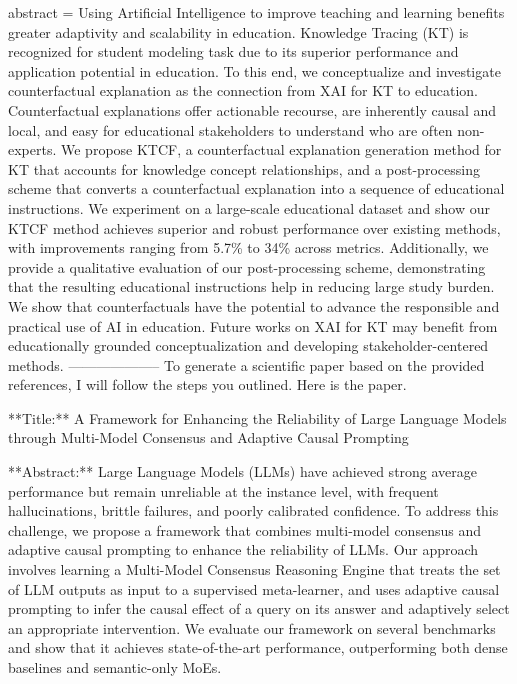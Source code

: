 {      abstract = {Using Artificial Intelligence to improve teaching and learning benefits greater adaptivity and scalability in education. Knowledge Tracing (KT) is recognized for student modeling task due to its superior performance and application potential in education. To this end, we conceptualize and investigate counterfactual explanation as the connection from XAI for KT to education. Counterfactual explanations offer actionable recourse, are inherently causal and local, and easy for educational stakeholders to understand who are often non-experts. We propose KTCF, a counterfactual explanation generation method for KT that accounts for knowledge concept relationships, and a post-processing scheme that converts a counterfactual explanation into a sequence of educational instructions. We experiment on a large-scale educational dataset and show our KTCF method achieves superior and robust performance over existing methods, with improvements ranging from 5.7\% to 34\% across metrics. Additionally, we provide a qualitative evaluation of our post-processing scheme, demonstrating that the resulting educational instructions help in reducing large study burden. We show that counterfactuals have the potential to advance the responsible and practical use of AI in education. Future works on XAI for KT may benefit from educationally grounded conceptualization and developing stakeholder-centered methods.}
}
        --------------------
         To generate a scientific paper based on the provided references, I will follow the steps you outlined. Here is the paper.

**Title:** A Framework for Enhancing the Reliability of Large Language Models through Multi-Model Consensus and Adaptive Causal Prompting

**Abstract:**
Large Language Models (LLMs) have achieved strong average performance but remain unreliable at the instance level, with frequent hallucinations, brittle failures, and poorly calibrated confidence. To address this challenge, we propose a framework that combines multi-model consensus and adaptive causal prompting to enhance the reliability of LLMs. Our approach involves learning a Multi-Model Consensus Reasoning Engine that treats the set of LLM outputs as input to a supervised meta-learner, and uses adaptive causal prompting to infer the causal effect of a query on its answer and adaptively select an appropriate intervention. We evaluate our framework on several benchmarks and show that it achieves state-of-the-art performance, outperforming both dense baselines and semantic-only MoEs.

